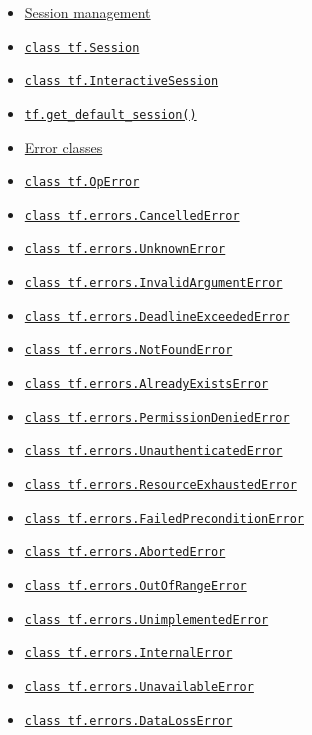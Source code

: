 \begin{itemize}
\tightlist
\item
  \protect\hyperlink{AUTOGENERATED-session-management}{Session
  management}
\item
  \protect\hyperlink{Session}{\texttt{class\ tf.Session}}
\item
  \protect\hyperlink{InteractiveSession}{\texttt{class\ tf.InteractiveSession}}
\item
  \protect\hyperlink{getux5fdefaultux5fsession}{\texttt{tf.get\_default\_session()}}
\item
  \protect\hyperlink{AUTOGENERATED-error-classes}{Error classes}
\item
  \protect\hyperlink{OpError}{\texttt{class\ tf.OpError}}
\item
  \protect\hyperlink{CancelledError}{\texttt{class\ tf.errors.CancelledError}}
\item
  \protect\hyperlink{UnknownError}{\texttt{class\ tf.errors.UnknownError}}
\item
  \protect\hyperlink{InvalidArgumentError}{\texttt{class\ tf.errors.InvalidArgumentError}}
\item
  \protect\hyperlink{DeadlineExceededError}{\texttt{class\ tf.errors.DeadlineExceededError}}
\item
  \protect\hyperlink{NotFoundError}{\texttt{class\ tf.errors.NotFoundError}}
\item
  \protect\hyperlink{AlreadyExistsError}{\texttt{class\ tf.errors.AlreadyExistsError}}
\item
  \protect\hyperlink{PermissionDeniedError}{\texttt{class\ tf.errors.PermissionDeniedError}}
\item
  \protect\hyperlink{UnauthenticatedError}{\texttt{class\ tf.errors.UnauthenticatedError}}
\item
  \protect\hyperlink{ResourceExhaustedError}{\texttt{class\ tf.errors.ResourceExhaustedError}}
\item
  \protect\hyperlink{FailedPreconditionError}{\texttt{class\ tf.errors.FailedPreconditionError}}
\item
  \protect\hyperlink{AbortedError}{\texttt{class\ tf.errors.AbortedError}}
\item
  \protect\hyperlink{OutOfRangeError}{\texttt{class\ tf.errors.OutOfRangeError}}
\item
  \protect\hyperlink{UnimplementedError}{\texttt{class\ tf.errors.UnimplementedError}}
\item
  \protect\hyperlink{InternalError}{\texttt{class\ tf.errors.InternalError}}
\item
  \protect\hyperlink{UnavailableError}{\texttt{class\ tf.errors.UnavailableError}}
\item
  \protect\hyperlink{DataLossError}{\texttt{class\ tf.errors.DataLossError}}
\end{itemize}

